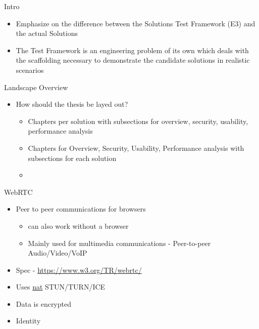 \begin{frame}{Intro}
\protect\hypertarget{intro}{}
\begin{itemize}
\tightlist
\item
  Emphasize on the difference between the Solutions Test Framework (E3)
  and the actual Solutions
\item
  The Test Framework is an engineering problem of its own which deals
  with the scaffolding necessary to demonstrate the candidate solutions
  in realistic scenarios
\end{itemize}
\end{frame}

\begin{frame}[fragile]{Landscape Overview}
\protect\hypertarget{landscape-overview}{}
\begin{itemize}
\tightlist
\item
  How should the thesis be layed out?

  \begin{itemize}
  \tightlist
  \item
    Chapters per solution with subsections for overview, security,
    usability, performance analysis
  \item
    Chapters for Overview, Security, Usability, Performance analysis
    with subsections for each solution
  \item
  \end{itemize}
\end{itemize}

\begin{block}{WebRTC}
\protect\hypertarget{webrtc}{}
\begin{itemize}
\tightlist
\item
  Peer to peer communications for browsers

  \begin{itemize}
  \tightlist
  \item
    can also work without a browser
  \item
    Mainly used for multimedia communications - Peer-to-peer
    Audio/Video/VoIP
  \end{itemize}
\item
  Spec -
  \href{https://www.w3.org/TR/webrtc/\#persistent-information-exposed-by-webrtc}{https://www.w3.org/TR/webrtc/}
\item
  Uses \href{notes/0202-nat}{nat} STUN/TURN/ICE
\item
  Data is encrypted
\item
  Identity


\end{itemize}
\end{block}
\end{frame}
